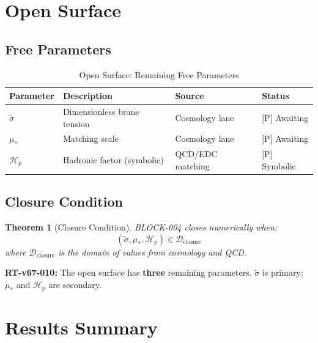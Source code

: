 \documentclass[11pt,letterpaper]{article}
\newtheorem{theorem}{Theorem}[section]
\newcommand{\st}{\tilde{\sigma}}
\newcommand{\Hp}{\mathcal{H}_p}
\begin{document}
\section{Open Surface}
\label{sec:open-surface}

\subsection{Free Parameters}
\label{subsec:free-params}

\begin{table}[h!]
\centering
\caption{Open Surface: Remaining Free Parameters}
\label{tab:open-surface}
\begin{tabular}{llll}
\toprule
Parameter & Description & Source & Status \\
\midrule
$\st$ & Dimensionless brane tension & Cosmology lane & [P] Awaiting \\
$\mu_*$ & Matching scale & Cosmology lane & [P] Awaiting \\
$\Hp$ & Hadronic factor (symbolic) & QCD/EDC matching & [P] Symbolic \\
\bottomrule
\end{tabular}
\end{table}

\subsection{Closure Condition}
\label{subsec:closure-condition}

\begin{theorem}[Closure Condition]
\label{thm:closure-condition}
BLOCK-004 closes numerically when:
\begin{equation}
(\st, \mu_*, \Hp) \in \mathcal{D}_{\text{closure}}
\label{eq:closure-domain}
\end{equation}
where $\mathcal{D}_{\text{closure}}$ is the domain of values from cosmology and QCD.
\end{theorem}

\begin{reviewertrap}
\textbf{RT-v67-010:} The open surface has \textbf{three} remaining parameters. $\st$ is primary; $\mu_*$ and $\Hp$ are secondary.
\end{reviewertrap}


\section{Results Summary}
\label{sec:results}
\end{document}
